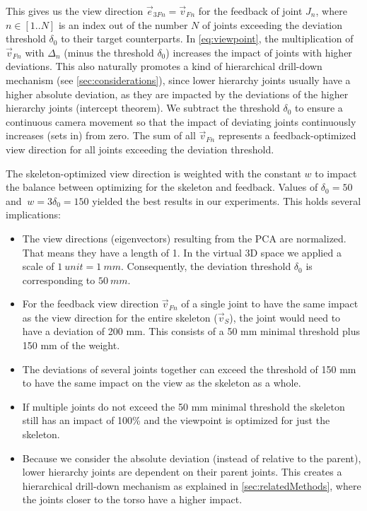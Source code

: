 This gives us the view direction \(\vec{e}_{3Fn} = \vec{v}_{Fn}\) for the feedback of joint $J_n$, where \(n\in[1..N]\) is an index out of the number $N$ of joints exceeding the deviation threshold \(\delta_0\) to their target counterparts. In \autoref{eq:viewpoint}, the multiplication  of $\vec{v}_{Fn}$ with \(\Delta_n\) (minus the threshold \(\delta_0\)) increases the impact of joints with higher deviations. This also naturally promotes a kind of hierarchical drill-down mechanism (see \autoref{sec:considerations}), since lower hierarchy joints usually have a higher absolute deviation, as they are impacted by the deviations of the higher hierarchy joints (intercept theorem). We subtract the threshold \(\delta_0\) to ensure a continuous camera movement so that the impact of deviating joints continuously increases (sets in) from zero. The sum of all $\vec{v}_{Fn}$ represents a feedback-optimized view direction for all joints exceeding the deviation threshold.

The skeleton-optimized view direction is weighted with the constant \(w\) to impact the balance between optimizing for the skeleton and feedback. Values of \(\delta_0 = 50\) and \(\ w = 3\delta_0 = 150\) yielded the best results in our experiments. This holds several implications:
\begin{itemize}
	\item The view directions (eigenvectors) resulting from the PCA are normalized. That means they have a length of 1. In the virtual 3D space we applied a scale of \(1\ unit = 1\ mm\). Consequently, the deviation threshold \(\delta_0\) is corresponding to \(50\ mm\).
	\item For the feedback view direction \(\vec{v}_{Fn}\)  of a single joint to have the same impact as the view direction for the entire skeleton ($\vec{v}_S$), the joint would need to have a deviation of 200 mm. This consists of a 50 mm minimal threshold plus 150 mm of the weight.
	\item The deviations of several joints together can exceed the threshold of 150 mm to have the same impact on the view as the skeleton as a whole.
	\item If multiple joints do not exceed the 50 mm minimal threshold the skeleton still has an impact of 100\% and the viewpoint is optimized for just the skeleton.
	\item Because we consider the absolute deviation (instead of relative to the parent), lower hierarchy joints are dependent on their parent joints. This creates a hierarchical drill-down mechanism as explained in \autoref{sec:relatedMethods}, where the joints closer to the torso have a higher impact.
\end{itemize}

